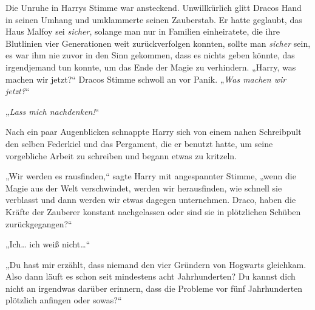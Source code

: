 Die Unruhe in Harrys Stimme war ansteckend. Unwillkürlich glitt Dracos Hand in seinen Umhang und umklammerte seinen Zauberstab. Er hatte geglaubt, das Haus Malfoy sei \emph{sicher}, solange man nur in Familien einheiratete, die ihre Blutlinien vier Generationen weit zurückverfolgen konnten, sollte man \emph{sicher} sein, es war ihm nie zuvor in den Sinn gekommen, dass es nichts geben könnte, das irgendjemand tun konnte, um das Ende der Magie zu verhindern. „Harry, was machen wir jetzt?“ Dracos Stimme schwoll an vor Panik. „\emph{Was machen wir jetzt?}“

„\emph{Lass mich nachdenken!}“

Nach ein paar Augenblicken schnappte Harry sich von einem nahen Schreibpult den selben Federkiel und das Pergament, die er benutzt hatte, um seine vorgebliche Arbeit zu schreiben und begann etwas zu kritzeln.

„Wir werden es rausfinden,“ sagte Harry mit angespannter Stimme, „wenn die Magie aus der Welt verschwindet, werden wir herausfinden, wie schnell sie verblasst und dann werden wir etwas dagegen unternehmen. Draco, haben die Kräfte der Zauberer konstant nachgelassen oder sind sie in plötzlichen Schüben zurückgegangen?“

„Ich… ich weiß nicht…“

„Du hast mir erzählt, dass niemand den vier Gründern von Hogwarts gleichkam. Also dann läuft es schon seit mindestens acht Jahrhunderten? Du kannst dich nicht an irgendwas darüber erinnern, dass die Probleme vor fünf Jahrhunderten plötzlich anfingen oder sowas?“

